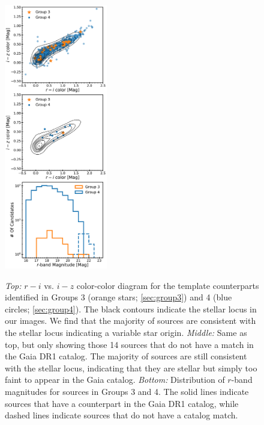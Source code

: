 \begin{figure}[!t]
\begin{center}
\hspace*{-0.1in} 
\scalebox{1.}
{\includegraphics[width=0.4\textwidth]{./figs/chapter3/f2.pdf}}
\caption{{\it Top:} $r-i$ vs. $i-z$ color-color diagram for the template counterparts identified in Groups 3 (orange stars; \autoref{sec:group3}) and 4 (blue circles; \autoref{sec:group4}). The black contours indicate the stellar locus in our images. We find that the majority of sources are consistent with the stellar locus indicating a variable star origin.
{\it Middle:} Same as top, but only showing those 14 sources that do not have a match in the Gaia DR1 catalog. The majority of sources are still consistent with the stellar locus, indicating that they are stellar but simply too faint to appear in the Gaia catalog.
{\it Bottom:} Distribution of $r$-band magnitudes for sources in Groups 3 and 4. The solid lines indicate sources that have a counterpart in the Gaia DR1 catalog, while dashed lines indicate sources that do not have a catalog match.}
\label{fig:color_color}
\end{center}
\end{figure}

